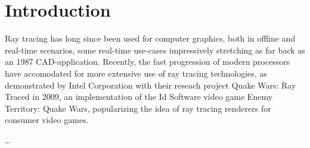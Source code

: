 \section{Introduction}
Ray tracing has long since been used for computer graphics, both in offline and real-time scenarios, some real-time use-cases impressively stretching as far back as an 1987 CAD-application\cite{stay87}.
Recently, the fast progression of modern processors have accomodated for more extensive use of ray tracing technologies, as demonstrated by Intel Corporation with their reseach project Quake Wars: Ray Traced in 2009\cite{pohl09}, an implementation of the Id Software video game Enemy Territory: Quake Wars, popularizing the idea of ray tracing renderers for consumer video games.

\ldots
